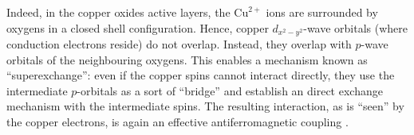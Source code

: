Indeed, in the copper oxides active layers, the $\mathrm{Cu}^{2+}$ ions are surrounded by oxygens in a closed shell configuration. Hence, copper $d_{x^2-y^2}$-wave orbitals (where conduction electrons reside) do not overlap. Instead, they overlap with $p$-wave orbitals of the neighbouring oxygens. This enables a mechanism known as ``superexchange'': even if the copper spins cannot interact directly, they use the intermediate $p$-orbitals as a sort of ``bridge'' and establish an direct exchange mechanism with the intermediate spins. The resulting interaction, as is ``seen'' by the copper electrons, is again an effective antiferromagnetic coupling \cite{pavarini2012correlated}.
